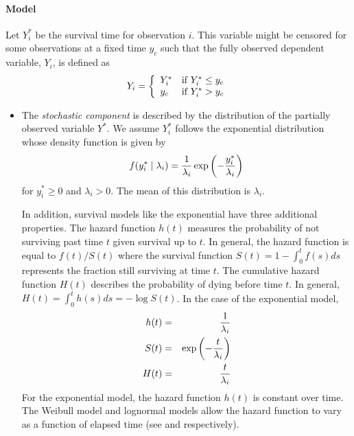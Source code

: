 \documentclass[letterpaper,10pt,english]{sphinxmanual}
\begin{document}
\paragraph{Model}
\label{zelig-exp:model}
Let \(Y_i^*\) be the survival time for observation \(i\). This
variable might be censored for some observations at a fixed time
\(y_c\) such that the fully observed dependent variable,
\(Y_i\), is defined as
\begin{gather}
\begin{split}Y_i = \left\{ \begin{array}{ll}
      Y_i^* & \textrm{if }Y_i^* \leq y_c \\
      y_c & \textrm{if }Y_i^* > y_c \\
    \end{array} \right.\end{split}\notag
\end{gather}\begin{itemize}
\item {} 
The \emph{stochastic component} is described by the distribution of the
partially observed variable \(Y^*\). We assume \(Y_i^*\)
follows the exponential distribution whose density function is given
by
\begin{gather}
\begin{split}f(y_i^*\mid \lambda_i) = \frac{1}{\lambda_i} \exp\left(-\frac{y_i^*}{\lambda_i}\right)\end{split}\notag
\end{gather}
for \(y_i^*\ge 0\) and \(\lambda_i>0\). The mean of this
distribution is \(\lambda_i\).

In addition, survival models like the exponential have three
additional properties. The hazard function \(h(t)\) measures the
probability of not surviving past time \(t\) given survival up to
\(t\). In general, the hazard function is equal to
\(f(t)/S(t)\) where the survival function
\(S(t) = 1 - \int_{0}^t f(s) ds\) represents the fraction still
surviving at time \(t\). The cumulative hazard function
\(H(t)\) describes the probability of dying before time
\(t\). In general,
\(H(t)= \int_{0}^{t} h(s) ds = -\log S(t)\). In the case of the
exponential model,
\begin{gather}
\begin{split}\begin{aligned}
h(t) &=& \frac{1}{\lambda_i} \\
S(t) &=& \exp\left( -\frac{t}{\lambda_i} \right) \\
H(t) &=& \frac{t}{\lambda_i}\end{aligned}\end{split}\notag
\end{gather}
For the exponential model, the hazard function \(h(t)\) is
constant over time. The Weibull model and lognormal models allow the
hazard function to vary as a function of elapsed time (see and
respectively).


\end{itemize}
\end{document}
